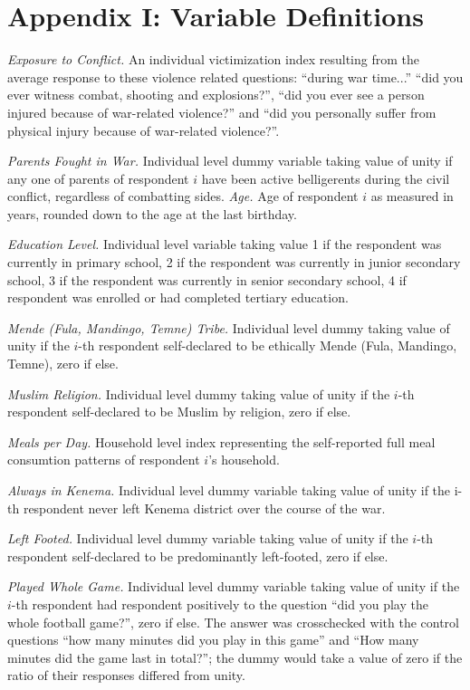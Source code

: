 \clearpage
\section{Appendix I: Variable Definitions}

\textit{Exposure to Conflict.} An individual victimization index resulting from the average response to these violence related questions: ``during war time...'' ``did you ever witness combat, shooting and explosions?'', ``did you ever see a person injured because of war-related violence?'' and ``did you personally suffer from physical injury because of war-related violence?''.

\textit{Parents Fought in War.} Individual level dummy variable taking value of unity if any one of parents of respondent $i$ have been active belligerents during the civil conflict, regardless of combatting sides.
\textit{Age.} Age of respondent $i$ as measured in years, rounded down to the age at the last birthday.

\textit{Education Level.} Individual level variable taking value 1 if the respondent was currently in primary school, 2 if the respondent was currently in junior secondary school, 3 if the respondent was currently in senior secondary school, 4 if respondent was enrolled or had completed tertiary education.

\textit{Mende (Fula, Mandingo, Temne) Tribe.} Individual level dummy taking value of unity if the $i$-th respondent self-declared to be ethically Mende (Fula, Mandingo, Temne), zero if else.


\textit{Muslim Religion.} Individual level dummy taking value of unity if the $i$-th respondent self-declared to be Muslim by religion, zero if else.

\textit{Meals per Day.} Household level index representing the self-reported full meal consumtion patterns of respondent $i$’s household.

\textit{Always in Kenema.} Individual level dummy variable taking value of unity if the i-th respondent never left Kenema district over the course of the war.

\textit{Left Footed.} Individual level dummy variable taking value of unity if the $i$-th respondent self-declared to be predominantly left-footed, zero if else.

\textit{Played Whole Game.} Individual level dummy variable taking value of unity if the $i$-th respondent had respondent positively to the question ``did you play the whole football game?'', zero if else. The answer was crosschecked with the control questions ``how many minutes did you play in this game'' and ``How many minutes did the game last in total?''; the dummy would take a value of zero if the ratio of their responses differed from unity.

